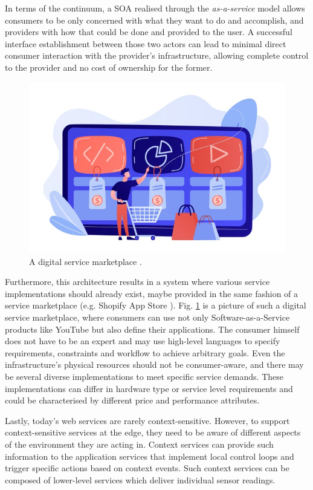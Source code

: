 In terms of the continuum, a SOA realised through the \emph{as-a-service} model allows consumers to be only concerned with what they want to do and accomplish, and providers with how that could be done and provided to the user. A successful interface establishment between those two actors can lead to minimal direct consumer interaction with the provider's infrastructure, allowing complete control to the provider and no cost of ownership for the former.

\begin{figure}[ht]
\centering
\includegraphics[width=\columnwidth]{figures/marketplace}
\caption{A digital service marketplace \label{fig:marketplace}.}
\end{figure}

Furthermore, this architecture results in a system where various service implementations should already exist, maybe provided in the same fashion of a service marketplace (e.g. Shopify App Store \cite{shopify}). Fig. \ref{fig:marketplace} is a picture of such a digital service marketplace, where consumers can use not only Software-as-a-Service products like YouTube but also define their applications. The consumer himself does not have to be an expert and may use high-level languages to specify requirements, constraints and workflow to achieve arbitrary goals. Even the infrastructure's physical resources should not be consumer-aware, and there may be several diverse implementations to meet specific service demands. These implementations can differ in hardware type or service level requirements and could be characterised by different price and performance attributes.

Lastly, today's web services are rarely context-sensitive. However, to support context-sensitive services at the edge, they need to be aware of different aspects of the environment they are acting in. Context services can provide such information to the application services that implement local control loops and trigger specific actions based on context events. Such context services can be composed of lower-level services which deliver individual sensor readings.

